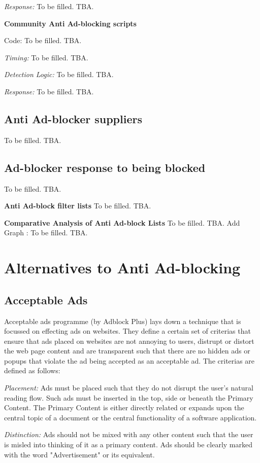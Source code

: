 \documentclass[runningheads,a4paper]{llncs}
\begin{document}
\textit{Response: } To be filled. TBA.



\textbf{Community Anti Ad-blocking scripts}

Code:  To be filled. TBA.

\textit{Timing:} To be filled. TBA.

\textit{Detection Logic:} To be filled. TBA.

\textit{Response:} To be filled. TBA.

\subsection{Anti Ad-blocker suppliers}
To be filled. TBA.

\subsection{Ad-blocker response to being blocked}
To be filled. TBA.

\textbf{Anti Ad-block filter lists}
To be filled. TBA.

\textbf{Comparative Analysis of Anti Ad-block Lists}
To be filled. TBA.
Add Graph : To be filled. TBA.

\section{Alternatives to Anti Ad-blocking}
\subsection{Acceptable Ads}
Acceptable ads programme (by Adblock Plus) lays down a technique that is focussed on effecting ads on websites. They define a certain set of criterias that ensure that ads placed on websites are not annoying to users, distrupt or distort the web page content and are transparent such that there are no hidden ads or popups that violate the ad being accepted as an acceptable ad. The criterias \cite{accads} are defined as follows:

\textit{Placement:} Ads must be placed such that they do not disrupt the user's natural reading flow. Such ads must be inserted in the top, side or beneath the Primary Content. The Primary Content is either directly related or expands upon the central topic of a document or the central functionality of a software application.

\textit{Distinction:} Ads should not be mixed with any other content such that the user is misled into thinking of it as a primary content. Ads should be clearly marked with the word "Advertisement" or its equivalent.
\end{document}
